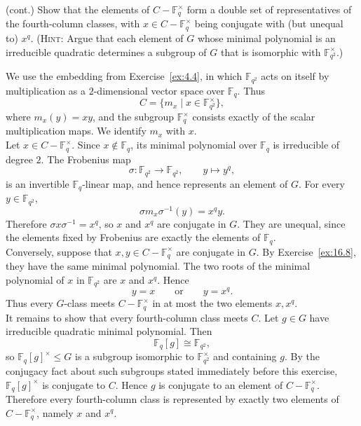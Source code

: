 \documentclass[../Odyssey_Project.tex]{subfiles}
\begin{document}
\begin{exercise}
\label{ex:16.16}
(cont.) Show that the elements of $C - \mathbb{F}_q^\times$ form a double set of representatives of the fourth-column classes, with $x \in C - \mathbb{F}_q^\times$ being conjugate with (but unequal to) $x^q$. (\textsc{Hint}: Argue that each element of $G$ whose minimal polynomial is an irreducible quadratic determines a subgroup of $G$ that is isomorphic with $\mathbb{F}_{q^2}^\times$.)
\end{exercise}
\begin{solution}
    We use the embedding from Exercise~\ref{ex:4.4}, in which $\mathbb{F}_{q^2}$ acts on itself by multiplication as a $2$-dimensional vector space over $\mathbb{F}_q$. Thus
    \[
        C=\{m_x\mid x\in\mathbb{F}_{q^2}^\times\},
    \]
    where $m_x(y)=xy$, and the subgroup $\mathbb{F}_q^\times$ consists exactly of the scalar multiplication maps. We identify $m_x$ with $x$.\\
    Let $x\in C-\mathbb{F}_q^\times$. Since $x\notin\mathbb{F}_q$, its minimal polynomial over $\mathbb{F}_q$ is irreducible of degree $2$. The Frobenius map
    \[
        \sigma\colon\mathbb{F}_{q^2}\to\mathbb{F}_{q^2},
        \qquad
        y\mapsto y^q,
    \]
    is an invertible $\mathbb{F}_q$-linear map, and hence represents an element of $G$. For every $y\in\mathbb{F}_{q^2}$,
    \[
        \sigma m_x\sigma^{-1}(y)=x^qy.
    \]
    Therefore $\sigma x\sigma^{-1}=x^q$, so $x$ and $x^q$ are conjugate in $G$. They are unequal, since the elements fixed by Frobenius are exactly the elements of $\mathbb{F}_q$.\\
    Conversely, suppose that $x,y\in C-\mathbb{F}_q^\times$ are conjugate in $G$. By Exercise~\ref{ex:16.8}, they have the same minimal polynomial. The two roots of the minimal polynomial of $x$ in $\mathbb{F}_{q^2}$ are $x$ and $x^q$. Hence
    \[
        y=x
        \qquad\text{or}\qquad
        y=x^q.
    \]
    Thus every $G$-class meets $C-\mathbb{F}_q^\times$ in at most the two elements $x,x^q$.\\
    It remains to show that every fourth-column class meets $C$. Let $g\in G$ have irreducible quadratic minimal polynomial. Then
    \[
        \mathbb{F}_q[g]\cong\mathbb{F}_{q^2},
    \]
    so $\mathbb{F}_q[g]^\times\leq G$ is a subgroup isomorphic to $\mathbb{F}_{q^2}^\times$ and containing $g$. By the conjugacy fact about such subgroups stated immediately before this exercise, $\mathbb{F}_q[g]^\times$ is conjugate to $C$. Hence $g$ is conjugate to an element of $C-\mathbb{F}_q^\times$. Therefore every fourth-column class is represented by exactly two elements of $C-\mathbb{F}_q^\times$, namely $x$ and $x^q$.
\end{solution}
\end{document}
